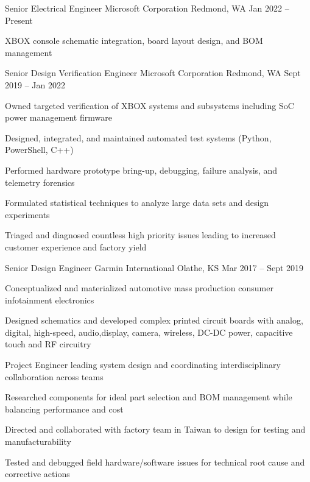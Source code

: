 \documentclass[]{awesome-cv}
\begin{document}
\begin{cventries}
	\cventry
	{Senior Electrical Engineer}
	{Microsoft Corporation}
	{Redmond, WA}
	{Jan 2022 – Present}
	{\begin{cvitems}
		\item {XBOX console schematic integration, board layout design, and BOM management}
	\end{cvitems}}
	\cventry
	{Senior Design Verification Engineer}
	{Microsoft Corporation}
	{Redmond, WA}
	{Sept 2019 – Jan 2022}
	{\begin{cvitems}
		\item {Owned targeted verification of XBOX systems and subsystems including SoC power management firmware}
		\item {Designed, integrated, and maintained automated test systems (Python, PowerShell, C++)}
		\item {Performed hardware prototype bring-up, debugging, failure analysis, and telemetry forensics}
		\item {Formulated statistical techniques to analyze large data sets and design experiments}
		\item {Triaged and diagnosed countless high priority issues leading to increased customer experience and factory yield}
	\end{cvitems}}
	\cventry
	{Senior Design Engineer}
	{Garmin International}
	{Olathe, KS}
	{Mar 2017 – Sept 2019}
	{\begin{cvitems}
		\item {Conceptualized and materialized automotive mass production consumer infotainment electronics}
		\item {Designed schematics and developed complex printed circuit boards with analog, digital, high-speed, audio,\hfill \break  display, camera, wireless, DC-DC power, capacitive touch and RF circuitry}
		\item {Project Engineer leading system design and coordinating interdisciplinary collaboration across teams}
		\item {Researched components for ideal part selection and BOM management while balancing performance and cost}
		\item {Directed and collaborated with factory team in Taiwan to design for testing and manufacturability}
		\item {Tested and debugged field hardware/software issues for technical root cause and corrective actions}

\end{cvitems}}
\end{cventries}
\end{document}
